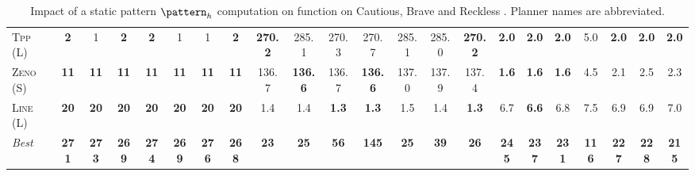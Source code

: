 \begin{table}[tb]
{\begin{tabular}{|l||ccccccc||ccccccc||ccccccc||}
\textsc{Tpp} (L)&\textbf{2}&1&\textbf{2}&\textbf{2}&1&1&\textbf{2}&\textbf{270.2}&285.1&270.3&270.7&285.1&285.0&\textbf{270.2}&\textbf{2.0}&\textbf{2.0}&\textbf{2.0}&5.0&\textbf{2.0}&\textbf{2.0}&\textbf{2.0}\\
\textsc{Zeno} (S)&\textbf{11}&\textbf{11}&\textbf{11}&\textbf{11}&\textbf{11}&\textbf{11}&\textbf{11}&136.7&\textbf{136.6}&136.7&\textbf{136.6}&137.0&137.9&137.4&\textbf{1.6}&\textbf{1.6}&\textbf{1.6}&4.5&2.1&2.5&2.3\\
\textsc{Line} (L)&\textbf{20}&\textbf{20}&\textbf{20}&\textbf{20}&\textbf{20}&\textbf{20}&\textbf{20}&1.4&1.4&\textbf{1.3}&\textbf{1.3}&1.5&1.4&\textbf{1.3}&6.7&\textbf{6.6}&6.8&7.5&6.9&6.9&7.0
\\\hline
\textit{Best}&\textbf{271}&\textbf{273}&\textbf{269}&\textbf{274}&\textbf{269}&\textbf{276}&\textbf{268}&\textbf{23}&\textbf{25}&\textbf{56}&\textbf{145}&\textbf{25}&\textbf{39}&\textbf{26}&\textbf{245}&\textbf{237}&\textbf{231}&\textbf{116}&\textbf{227}&\textbf{228}&\textbf{215}\\\hline

        \end{tabular}}
        \caption{Impact of a static pattern $\pattern_h$ computation on function on Cautious, Brave and Reckless \pattyd. Planner names are abbreviated.}
        \label{tab:abl-patternh-static}
        \end{table}
        